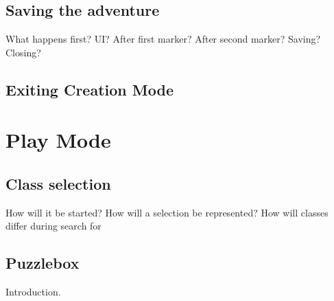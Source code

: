 \documentclass{sigchi-ext}
\begin{document}
\subsection{Saving the adventure}
What happens first?
UI?
After first marker?
After second marker?
Saving?
Closing?

\subsection{Exiting Creation Mode}

\section{Play Mode}
\label{sec:Play}

\subsection{Class selection}

How will it be started?
How will a selection be represented?
How will classes differ during search for 

\subsection{Puzzlebox}
Introduction.




\end{document}
